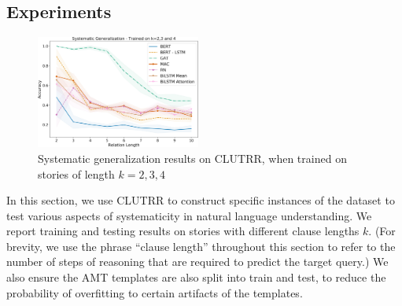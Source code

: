 \documentclass[12pt]{article}
\begin{document}





\subsection{Experiments}

\begin{figure}
\begin{center}
  \includegraphics[width=0.48\textwidth]{images/clutrr_sys_gen_234.png}
\end{center}
\caption{Systematic generalization results on CLUTRR, when trained on stories of length $k=2,3,4$}
\label{fig:clutrr_sys_gen_234}
\end{figure}

In this section, we use CLUTRR to construct specific instances of the dataset to test various aspects of systematicity in natural language understanding.
We report training and testing results on stories with different clause lengths $k$.
(For brevity, we use the phrase ``clause length'' throughout this section to refer to the number of steps of reasoning that are required to predict the target query.)
We also ensure the AMT templates are also split into train and test, to reduce the probability of overfitting to certain artifacts of the templates.
\end{document}
